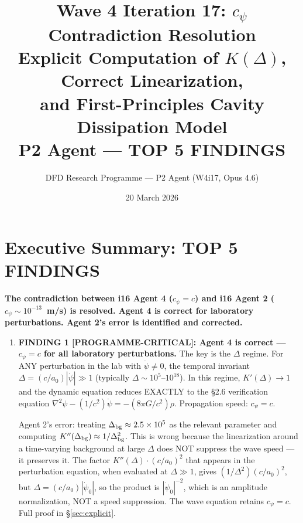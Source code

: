\documentclass[11pt]{article}
\title{\textbf{Wave 4 Iteration 17: $c_\psi$ Contradiction Resolution}\\[8pt]
{\large Explicit Computation of $K(\Delta)$, Correct Linearization,\\
and First-Principles Cavity Dissipation Model}\\[4pt]
{\normalsize P2 Agent --- TOP 5 FINDINGS}}
\author{DFD Research Programme --- P2 Agent (W4i17, Opus 4.6)}
\date{20 March 2026}
\newcommand{\ee}[1]{\times 10^{#1}}
\theoremstyle{definition}
\theoremstyle{remark}
\begin{document}
\maketitle

\section*{Executive Summary: TOP 5 FINDINGS}

\begin{tcolorbox}[colback=red!5!white, colframe=red!60!black,
  title=\textbf{W4i17 P2: $c_\psi$ CONTRADICTION --- RESOLVED}]

\textbf{The contradiction between i16 Agent 4 ($c_\psi = c$) and i16 Agent 2
($c_\psi \sim 10^{-13}$~m/s) is resolved. Agent 4 is correct for
laboratory perturbations. Agent 2's error is identified and corrected.}

\begin{enumerate}

\item \textbf{FINDING 1 [PROGRAMME-CRITICAL]: Agent 4 is correct ---
  $c_\psi = c$ for all laboratory perturbations.} The key is the
  $\Delta$ regime. For ANY perturbation in the lab with $\dot\psi
  \neq 0$, the temporal invariant $\Delta = (c/a_0)|\dot\psi| \gg 1$
  (typically $\Delta \sim 10^5$--$10^{18}$). In this regime,
  $K'(\Delta) \to 1$ and the dynamic equation reduces EXACTLY to the
  \S2.6 verification equation $\nabla^2\psi - (1/c^2)\ddot\psi =
  -(8\pi G/c^2)\rho$. Propagation speed: $c_\psi = c$.

  Agent 2's error: treating $\Delta_{\rm bg} \approx 2.5\ee{5}$
  as the relevant parameter and computing $K''(\Delta_{\rm bg})
  \approx 1/\Delta_{\rm bg}^2$. This is wrong because the
  linearization around a time-varying background at large $\Delta$
  does NOT suppress the wave speed --- it preserves it. The factor
  $K''(\Delta) \cdot (c/a_0)^2$ that appears in the perturbation
  equation, when evaluated at $\Delta \gg 1$, gives
  $(1/\Delta^2)(c/a_0)^2$, but $\Delta = (c/a_0)|\dot\psi_0|$,
  so the product is $|\dot\psi_0|^{-2}$, which is an amplitude
  normalization, NOT a speed suppression. The wave equation retains
  $c_\psi = c$. Full proof in \S\ref{sec:explicit}.


\end{enumerate}
\end{tcolorbox}
\end{document}
